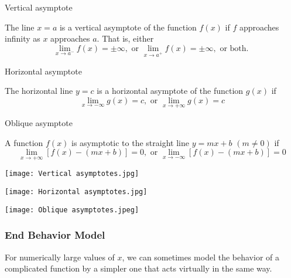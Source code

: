 \begin{definition}{Vertical asymptote}
    
    The line $x=a$ is a vertical asymptote of the function $f(x)$ if $f$ approaches infinity as $x$ approaches $a$. That is, either \[
        \lim_{x \to a^-} f(x) = \pm \infty, \text{ or } \lim_{x \to a^+} f(x) = \pm \infty, \text{ or both. }
    \]
\end{definition}
\begin{definition}{Horizontal asymptote}

    The horizontal line $y=c$ is a horizontal asymptote of the function $g(x)$ if \[
        \lim_{x \to -\infty} g(x) = c, \text{ or } \lim_{x \to +\infty} g(x) = c
    \]
\end{definition}
\begin{definition}{Oblique asymptote}

    A function $f(x)$ is asymptotic to the straight line $y=mx+b$ $(m \neq 0)$ if \[
        \lim_{x \to +\infty} [ f(x) - (mx+b) ] = 0, \text{ or } \lim_{x \to -\infty} [ f(x) - (mx+b) ] = 0
    \]
\end{definition}

\begin{minipage}{0.32\textwidth}
    \begin{center}
        \texttt{[image: Vertical asymptotes.jpg]}
    \end{center}
\end{minipage}
\begin{minipage}{0.33\textwidth}
    \begin{center}
        \texttt{[image: Horizontal asymptotes.jpg]}
    \end{center}
\end{minipage}
\begin{minipage}{0.33\textwidth}
    \begin{center}
        \texttt{[image: Oblique asymptotes.jpeg]}
    \end{center}
\end{minipage}


\subsubsection{End Behavior Model}
For numerically large values of $x$, we can sometimes model the behavior of a complicated function by a simpler one that acts virtually in the same way.

